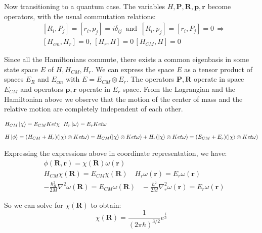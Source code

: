 Now transitioning to a quantum case. The variables $ H, \mathbf{P}, \mathbf{R}, \mathbf{p}, \mathbf{r} $ become operators, with the usual commutation relations:
\begin{equation}
\begin{split}
& [R_i, P_j] = [r_i,p_j] = i\delta_{ij}\,\text{ and }\,[R_i, p_j] = [r_i,P_j] = 0 \,\Longrightarrow \\[.8em]
& [H_{cm},H_r] = 0,\,[H_r,H] = 0\,[H_{CM},H] = 0
\end{split}
\end{equation}

Since all the Hamiltonians commute, there exists a common eigenbasis in some state space $ E $ of $ H,H_{CM}, H_r $. We can express the space $ E $ as a tensor product of spaces $ E_R $ and $ E_{cm} $ with $ E = E_{CM} \otimes E_r $. The operators $ \mathbf{P}, \mathbf{R} $ operate in space $ E_{CM} $ and operators $ \mathbf{p}, \mathbf{r} $ operate in $ E_r $ space. From the Lagrangian and the Hamiltonian above we observe that the motion of the center of mass and the relative motion are completely independent of each other.

\begin{equation}
\begin{split}
& H_{CM}\Ket{\chi} = E_{CM}Ket{\chi}\,\,\,\,H_{r}\Ket{\omega} = E_{r}Ket{\omega}\\[.8em]
& H\Ket{\phi} = (H_{CM} + H_{r})(\Ket{\chi} \otimes Ket{\omega}) = H_{CM}(\Ket{\chi} \otimes Ket{\omega}) + H_{r}(\Ket{\chi} \otimes Ket{\omega}) = (E_{CM} + E_{r})(\Ket{\chi} \otimes Ket{\omega})
\end{split}
\end{equation}

Expressing the expressions above in coordinate representation, we have:
\begin{equation}
\begin{split}
& \phi(\mathbf{R},\mathbf{r}) = \chi(\mathbf{R})\omega(\mathbf{r}) \\[.8em]
& H_{CM}\chi(\mathbf{R}) = E_{CM}\chi(\mathbf{R})\,\,\,\,\,\,H_r\omega(\mathbf{r}) = E_r\omega(\mathbf{r}) \\[.8em]
& -\frac{\hbar_R^2}{2M}\nabla^2\omega(\mathbf{R}) =  E_{CM}\omega(\mathbf{R})\,\,\,\,\,-\frac{\hbar^2}{2M}\nabla_r^2\omega(\mathbf{r}) =  E_{r}\omega(\mathbf{r})
\end{split}
\end{equation}

So we can solve for $ \chi(\mathbf{R}) $ to obtain:
\begin{equation}
\chi(\mathbf{R}) = \frac{1}{(2\pi\hbar)^{3/2}}e^{\frac{i}{\hbar}}
\end{equation}


